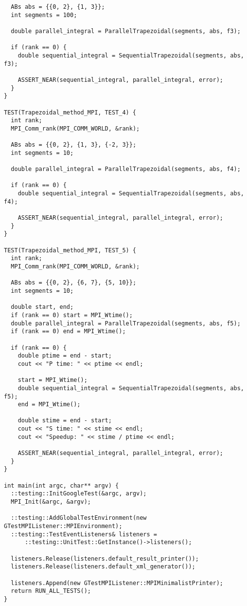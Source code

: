 \documentclass{report}
\begin{document}
\begin{lstlisting}
  ABs abs = {{0, 2}, {1, 3}};
  int segments = 100;

  double parallel_integral = ParallelTrapezoidal(segments, abs, f3);

  if (rank == 0) {
    double sequential_integral = SequentialTrapezoidal(segments, abs, f3);

    ASSERT_NEAR(sequential_integral, parallel_integral, error);
  }
}

TEST(Trapezoidal_method_MPI, TEST_4) {
  int rank;
  MPI_Comm_rank(MPI_COMM_WORLD, &rank);

  ABs abs = {{0, 2}, {1, 3}, {-2, 3}};
  int segments = 10;

  double parallel_integral = ParallelTrapezoidal(segments, abs, f4);

  if (rank == 0) {
    double sequential_integral = SequentialTrapezoidal(segments, abs, f4);

    ASSERT_NEAR(sequential_integral, parallel_integral, error);
  }
}

TEST(Trapezoidal_method_MPI, TEST_5) {
  int rank;
  MPI_Comm_rank(MPI_COMM_WORLD, &rank);

  ABs abs = {{0, 2}, {6, 7}, {5, 10}};
  int segments = 10;

  double start, end;
  if (rank == 0) start = MPI_Wtime();
  double parallel_integral = ParallelTrapezoidal(segments, abs, f5);
  if (rank == 0) end = MPI_Wtime();

  if (rank == 0) {
    double ptime = end - start;
    cout << "P time: " << ptime << endl;

    start = MPI_Wtime();
    double sequential_integral = SequentialTrapezoidal(segments, abs, f5);
    end = MPI_Wtime();

    double stime = end - start;
    cout << "S time: " << stime << endl;
    cout << "Speedup: " << stime / ptime << endl;

    ASSERT_NEAR(sequential_integral, parallel_integral, error);
  }
}

int main(int argc, char** argv) {
  ::testing::InitGoogleTest(&argc, argv);
  MPI_Init(&argc, &argv);

  ::testing::AddGlobalTestEnvironment(new GTestMPIListener::MPIEnvironment);
  ::testing::TestEventListeners& listeners =
      ::testing::UnitTest::GetInstance()->listeners();

  listeners.Release(listeners.default_result_printer());
  listeners.Release(listeners.default_xml_generator());

  listeners.Append(new GTestMPIListener::MPIMinimalistPrinter);
  return RUN_ALL_TESTS();
}
\end{lstlisting}
\end{document}
